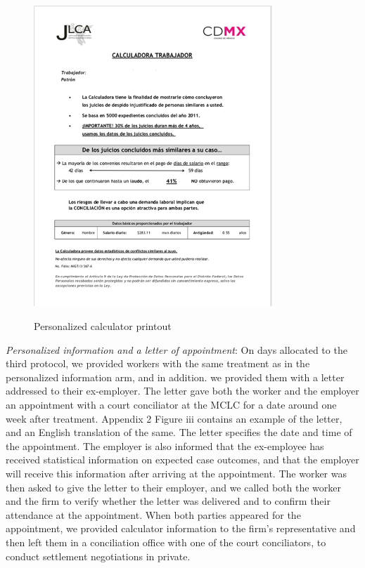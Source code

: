 \documentclass[oneside,12pt]{article}
\begin{document}
\begin{figure}[!htbp] %
   \begin{center}
   \centering
    \caption{Personalized calculator printout}
    \includegraphics[width=0.8\textwidth]{Figures/Figure2.png}
    \label{fig:2}
    \end{center}
\end{figure}

\emph{Personalized information and a letter of appointment}: On days allocated to the third protocol, we provided workers with the same treatment as in the personalized information arm, and in addition. we provided them with a letter addressed to their ex-employer. The letter gave both the worker and the employer an appointment with a court conciliator at the MCLC for a date around one week after treatment. Appendix 2 Figure iii contains an example of the letter, and an English translation of the same. The letter specifies the date and time of the appointment. The employer is also informed that the ex-employee has received statistical information on expected case outcomes, and that the employer will receive this information after arriving at the appointment. The worker was then asked to give the letter to their employer, and we called both the worker and the firm to verify whether the letter was delivered and to confirm their attendance at the appointment. When both parties appeared for the appointment, we provided calculator information to the firm’s representative and then left them in a conciliation office with one of the court conciliators, to conduct settlement negotiations in private. 
\end{document}

